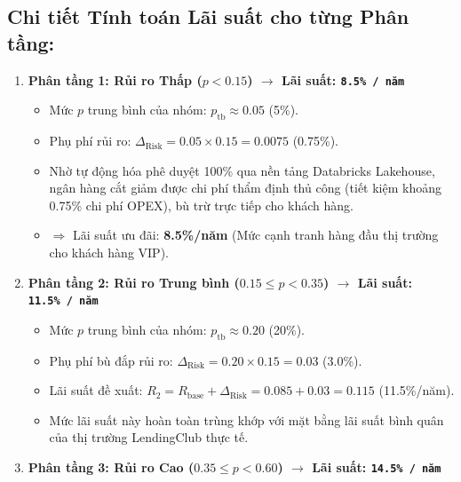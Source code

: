 \documentclass[
  13pt,
  a4paper,
]{report}
\providecommand{\tightlist}{%
  \setlength{\itemsep}{0pt}\setlength{\parskip}{0pt}}
\begin{document}
\subsection{Chi tiết Tính toán Lãi suất cho từng Phân
tầng:}\label{chi-tiux1ebft-tuxednh-touxe1n-luxe3i-suux1ea5t-cho-tux1eebng-phuxe2n-tux1ea7ng}

\begin{enumerate}
\def\labelenumi{\arabic{enumi}.}
\tightlist
\item
  \textbf{Phân tầng 1: Rủi ro Thấp (\(p < 0.15\)) \(\rightarrow\) Lãi
  suất: \texttt{8.5\%\ /\ năm}}

  \begin{itemize}
  \tightlist
  \item
    Mức \(p\) trung bình của nhóm: \(p_{\text{tb}} \approx 0.05\) (5\%).
  \item
    Phụ phí rủi ro: \(\Delta_{\text{Risk}} = 0.05 \times 0.15 = 0.0075\)
    (0.75\%).
  \item
    Nhờ tự động hóa phê duyệt 100\% qua nền tảng Databricks Lakehouse,
    ngân hàng cắt giảm được chi phí thẩm định thủ công (tiết kiệm khoảng
    0.75\% chi phí OPEX), bù trừ trực tiếp cho khách hàng.
  \item
    \(\Rightarrow\) Lãi suất ưu đãi: \textbf{8.5\%/năm} (Mức cạnh tranh
    hàng đầu thị trường cho khách hàng VIP).
  \end{itemize}
\item
  \textbf{Phân tầng 2: Rủi ro Trung bình (\(0.15 \le p < 0.35\))
  \(\rightarrow\) Lãi suất: \texttt{11.5\%\ /\ năm}}

  \begin{itemize}
  \tightlist
  \item
    Mức \(p\) trung bình của nhóm: \(p_{\text{tb}} \approx 0.20\)
    (20\%).
  \item
    Phụ phí bù đắp rủi ro:
    \(\Delta_{\text{Risk}} = 0.20 \times 0.15 = 0.03\) (3.0\%).
  \item
    Lãi suất đề xuất:
    \(R_2 = R_{\text{base}} + \Delta_{\text{Risk}} = 0.085 + 0.03 = 0.115\)
    (11.5\%/năm).
  \item
    Mức lãi suất này hoàn toàn trùng khớp với mặt bằng lãi suất bình
    quân của thị trường LendingClub thực tế.
  \end{itemize}
\item
  \textbf{Phân tầng 3: Rủi ro Cao (\(0.35 \le p < 0.60\))
  \(\rightarrow\) Lãi suất: \texttt{14.5\%\ /\ năm}}


\end{enumerate}
\end{document}
